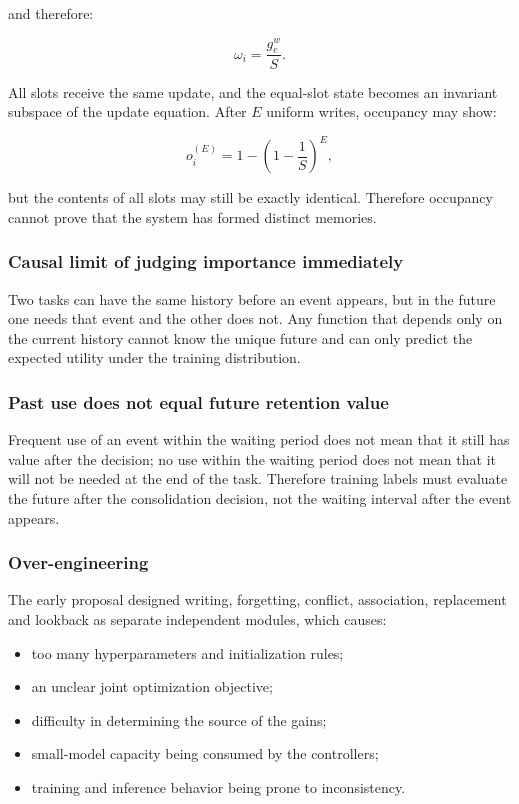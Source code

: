 and therefore:

\[
\omega_i=\frac{g_e^w}{S}.
\]

All slots receive the same update, and the equal-slot state becomes an invariant subspace of the update equation. After $E$ uniform writes, occupancy may show:

\[
o_i^{(E)}=1-\left(1-\frac1S\right)^E,
\]

but the contents of all slots may still be exactly identical. Therefore occupancy cannot prove that the system has formed distinct memories.

\subsubsection{Causal limit of judging importance immediately}

Two tasks can have the same history before an event appears, but in the future one needs that event and the other does not. Any function that depends only on the current history cannot know the unique future and can only predict the expected utility under the training distribution.

\subsubsection{Past use does not equal future retention value}

Frequent use of an event within the waiting period does not mean that it still has value after the decision; no use within the waiting period does not mean that it will not be needed at the end of the task. Therefore training labels must evaluate the future after the consolidation decision, not the waiting interval after the event appears.

\subsubsection{Over-engineering}

The early proposal designed writing, forgetting, conflict, association, replacement and lookback as separate independent modules, which causes:

\begin{itemize}
  \item too many hyperparameters and initialization rules;
  \item an unclear joint optimization objective;
  \item difficulty in determining the source of the gains;
  \item small-model capacity being consumed by the controllers;
  \item training and inference behavior being prone to inconsistency.
\end{itemize}

